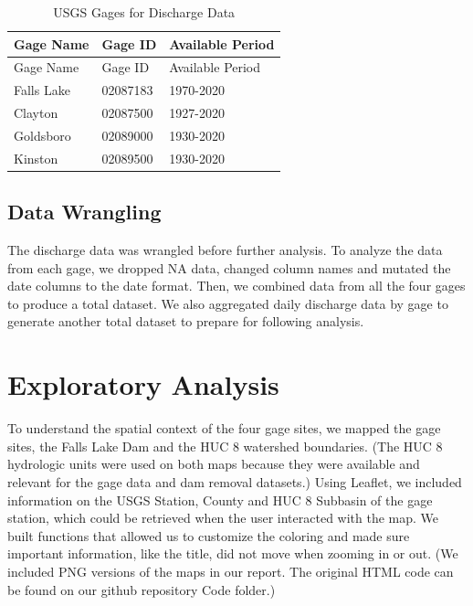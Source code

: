 \documentclass[
  12pt,
]{article}
\begin{document}
\begin{longtable}[]{@{}lll@{}}
\caption{USGS Gages for Discharge Data}\tabularnewline
\toprule
Gage Name & Gage ID & Available Period\tabularnewline
\midrule
\endfirsthead
\toprule
Gage Name & Gage ID & Available Period\tabularnewline
\midrule
\endhead
Falls Lake & 02087183 & 1970-2020\tabularnewline
Clayton & 02087500 & 1927-2020\tabularnewline
Goldsboro & 02089000 & 1930-2020\tabularnewline
Kinston & 02089500 & 1930-2020\tabularnewline
\bottomrule
\end{longtable}

\hypertarget{data-wrangling}{%
\subsection{Data Wrangling}\label{data-wrangling}}

The discharge data was wrangled before further analysis. To analyze the
data from each gage, we dropped NA data, changed column names and
mutated the date columns to the date format. Then, we combined data from
all the four gages to produce a total dataset. We also aggregated daily
discharge data by gage to generate another total dataset to prepare for
following analysis.

\newpage

\hypertarget{exploratory-analysis}{%
\section{Exploratory Analysis}\label{exploratory-analysis}}

To understand the spatial context of the four gage sites, we mapped the
gage sites, the Falls Lake Dam and the HUC 8 watershed boundaries. (The
HUC 8 hydrologic units were used on both maps because they were
available and relevant for the gage data and dam removal datasets.)
Using Leaflet, we included information on the USGS Station, County and
HUC 8 Subbasin of the gage station, which could be retrieved when the
user interacted with the map. We built functions that allowed us to
customize the coloring and made sure important information, like the
title, did not move when zooming in or out. (We included PNG versions of
the maps in our report. The original HTML code can be found on our
github repository Code folder.)
\end{document}
